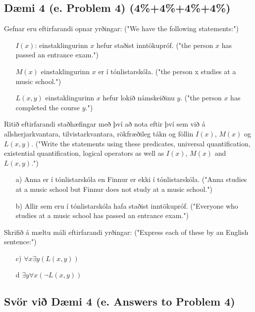 \newpage
\subsection*{Dæmi 4 (e. Problem 4) (4\%+4\%+4\%+4\%) \label{section:daemi4}}
Gefnar eru eftirfarandi opnar yrðingar: ("We have the following statements:")
\begin{itemize}
    \item[] $I(x)$: einstaklingurinn $x$ hefur staðist inntökupróf. ("the person $x$ has passed an entrance exam.")
    \item[] $M(x)$ einstaklingurinn $x$ er í tónlistarskóla. ("the person x studies at a music school.")
    \item[] $L(x,y)$ einstaklingurinn $x$ hefur lokið námskeiðinu $y$. ("the person $x$ has completed the course $y$.")
\end{itemize}
Ritið eftirfarandi staðhæfingar með því að nota eftir því sem við á allsherjarkvantara, tilvistarkvantara, rökfræðileg tákn og föllin $I(x)$, $M(x)$ og $L(x,y)$. ("Write the statements using these predicates, universal quantification, existential quantification, logical operators as well as $I(x)$, $M(x)$ and $L(x,y)$.")
\begin{itemize}
    \item[a)] Anna er í tónlistarskóla en Finnur er ekki í tónlistarskóla. ("Anna studies at a music school but Finnur does not study at a music school.")
    \item[b)] Allir sem eru í tónlistarskóla hafa staðist inntökupróf. ("Everyone who studies at a music school has passed an entrance exam.")
\end{itemize}
Skrifið á mæltu máli eftirfarandi yrðingar: ("Express each of these by an English sentence:") 
\begin{itemize}
    \item[c)] $\forall x \exists y (L(x,y))$
    \item[d] $\exists y\forall x (\neg L(x,y))$
\end{itemize}

\subsection*{Svör við Dæmi 4 (e. Answers to Problem 4)}

\newcommand{\makeAnswerBoxProblemFourA}{
  \begin{tcolorbox}[colframe=black, colback=white, boxrule=0.5pt, arc=0pt, outer arc=0pt, height=2.2cm, width=\linewidth, top=1mm, bottom=1mm, left=1mm, right=1mm]

    
  \end{tcolorbox}
}

